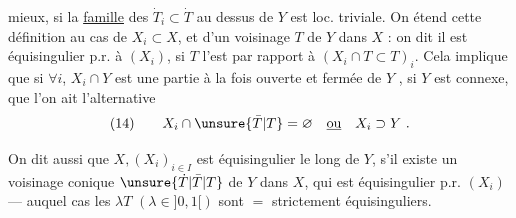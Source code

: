 mieux, si la \uline{famille} des $\dot T_i\subset\dot T$ au dessus
de $Y$ est  loc. triviale. On étend cette
définition au cas de $X_i\subset X$, et d'un
voisinage  $T$ de $Y$ dans $X$ :
on dit
il est équisingulier p.r. à $(X_i)$, si $T$
l'est par rapport à $(X_i\cap T\subset T)_i$.
Cela
implique que si $\forall i$, $X_i\cap Y$ est une
partie à la fois ouverte et fermée de $Y$
, si $Y$ est connexe, que 
l'on ait l'alternative
\[
(14)\qquad X_i\cap\unsure{\bar T|T}=\varnothing\quad\underline{\text{ou}}\quad X_i\supset Y\ .
\]
\margin{on dit qu'il est \uline{strictement équisingulier}
si de plus il est \uline{strictement} \unsure{compatible avec tous}
les $X_i$.
Si $T$ équisingulier p.r. à $(X_i)$,
$\lambda T$ l'est strictement pour $\lambda\in]0,1[$.}

On dit aussi que $X,(X_i)_{i\in I}$ est
 équisingulier
le long de $Y$, s'il existe un voisinage conique
 $\unsure{\dot T|\bar T|T}$ de $Y$ dans $X$, qui est équisingulier
p.r.  $(X_i)$ --- auquel cas les $\lambda T$
$(\lambda\in]0,1[)$ sont $=$ strictement équisinguliers.
